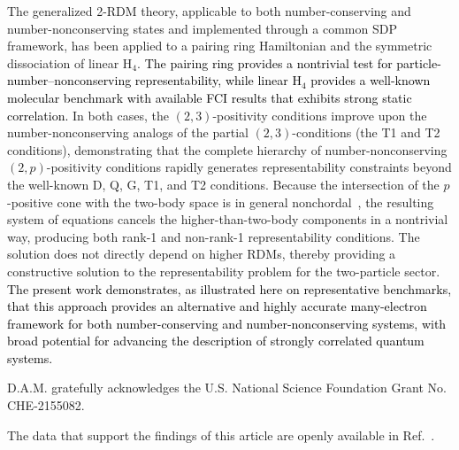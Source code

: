 \documentclass[aps,prl,floatfix,twocolumn,showpacs,10pt]{revtex4-2}
\begin{document}
The generalized 2-RDM theory, applicable to both number-conserving and number-nonconserving states and implemented through a common SDP framework, has been applied to a pairing ring Hamiltonian and the symmetric dissociation of linear H$_4$. \textcolor{black}{The pairing ring provides a nontrivial test for particle-number–nonconserving representability, while linear H$_4$ provides a well-known molecular benchmark with available FCI results that exhibits strong static correlation.}  In both cases, the $(2,3)$-positivity conditions improve upon the number-nonconserving analogs of the partial $(2,3)$-conditions (the T1 and T2 conditions), demonstrating that the complete hierarchy of number-nonconserving $(2,p)$-positivity conditions rapidly generates representability constraints beyond the well-known D, Q, G, T1, and T2 conditions. Because the intersection of the $p$-positive cone with the two-body space is in general nonchordal~\cite{Grone.1984, Fawzi.2015}, the resulting system of equations cancels the higher-than-two-body components in a nontrivial way, producing both rank-1 and non-rank-1 representability conditions. The solution does not directly depend on higher RDMs, thereby providing a constructive solution to the representability problem for the two-particle sector. \textcolor{black}{The present work demonstrates, as illustrated here on representative benchmarks, that this approach provides an alternative and highly accurate many-electron framework for both number-conserving and number-nonconserving systems, with broad potential for advancing the description of strongly correlated quantum systems.}

\begin{acknowledgments}

D.A.M. gratefully acknowledges the U.S. National Science Foundation Grant No. CHE-2155082.

\end{acknowledgments}

 The data that support the findings of this article are openly available in Ref.~\cite{Data}.


\end{document}
